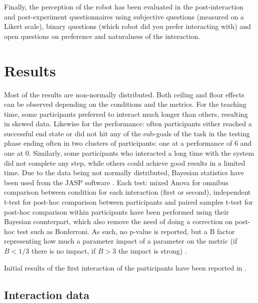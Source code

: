 Finally, the perception of the robot has been evaluated in the post-interaction and post-experiment questionnaires using subjective questions (measured on a Likert scale), binary questions (which robot did you prefer interacting with) and open questions on preference and naturalness of the interaction. 

\section{Results}

Most of the results are non-normally distributed. Both ceiling and floor effects can be observed depending on the conditions and the metrics. For the teaching time, some participants preferred to interact much longer than others, resulting in skewed data. Likewise for the performance: often participants either reached a successful end state or did not hit any of the sub-goals of the task in the testing phase ending often in two clusters of participants: one at a performance of 6 and one at 0.  Similarly, some participants who interacted a long time with the system did not complete any step, while others could achieve good results in a limited time. Due to the data being not normally distributed, Bayesian statistics have been used from the JASP software \citep{jasp2018}. Each test: mixed Anova for omnibus comparison between condition for each interaction (first or second), independent t-test for post-hoc comparison between participants and paired samples t-test for post-hoc comparison within participants have been performed using their Bayesian counterpart, which also remove the need of doing a correction on post-hoc test such as Bonferroni. As such, no p-value is reported, but a B factor representing how much a parameter impact of a parameter on the metric (if $B < 1/3$ there is no impact, if $B > 3$ the impact is strong) \citep{dienes2011bayesian,jeffreys1998theory}.

Initial results of the first interaction of the participants have been reported in \cite{senft2016providing}.


\subsection{Interaction data}

